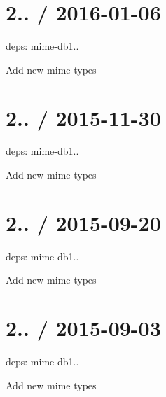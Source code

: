 \section*{2.. / 2016-\/01-\/06 }


\begin{DoxyItemize}
\item deps\+: mime-\/db1..
\begin{DoxyItemize}
\item Add new mime types
\end{DoxyItemize}
\end{DoxyItemize}

\section*{2.. / 2015-\/11-\/30 }


\begin{DoxyItemize}
\item deps\+: mime-\/db1..
\begin{DoxyItemize}
\item Add new mime types
\end{DoxyItemize}
\end{DoxyItemize}

\section*{2.. / 2015-\/09-\/20 }


\begin{DoxyItemize}
\item deps\+: mime-\/db1..
\begin{DoxyItemize}
\item Add new mime types
\end{DoxyItemize}
\end{DoxyItemize}

\section*{2.. / 2015-\/09-\/03 }


\begin{DoxyItemize}
\item deps\+: mime-\/db1..
\begin{DoxyItemize}
\item Add new mime types
\end{DoxyItemize}
\end{DoxyItemize}

